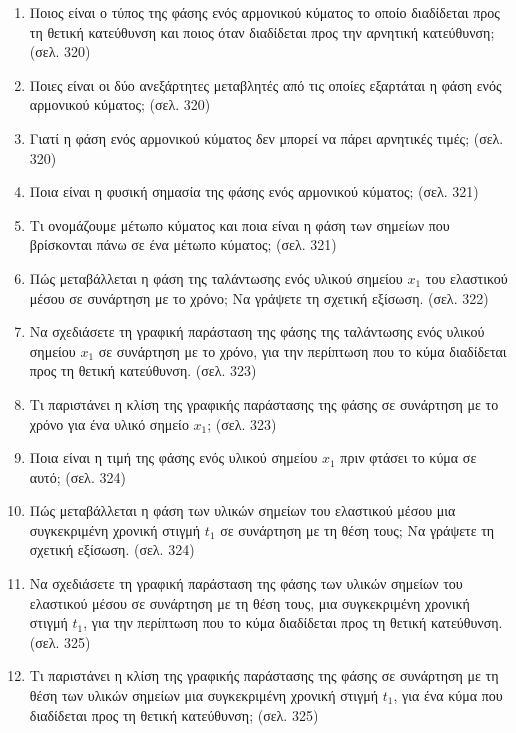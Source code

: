 \documentclass{article}
\begin{document}
\begin{enumerate}
      \item Ποιος είναι ο τύπος της φάσης ενός αρμονικού κύματος το οποίο διαδίδεται προς τη θετική κατεύθυνση και ποιος όταν διαδίδεται προς την αρνητική κατεύθυνση; (σελ. 320)

      \item Ποιες είναι οι δύο ανεξάρτητες μεταβλητές από τις οποίες εξαρτάται η φάση ενός αρμονικού κύματος; (σελ. 320)

      \item Γιατί η φάση ενός αρμονικού κύματος δεν μπορεί να πάρει αρνητικές τιμές; (σελ. 320)

      \item Ποια είναι η φυσική σημασία της φάσης ενός αρμονικού κύματος; (σελ. 321)

      \item Τι ονομάζουμε μέτωπο κύματος και ποια είναι η φάση των σημείων που βρίσκονται πάνω σε ένα μέτωπο κύματος; (σελ. 321)

      \item Πώς μεταβάλλεται η φάση της ταλάντωσης ενός υλικού σημείου $x_1$ του ελαστικού μέσου σε συνάρτηση με το χρόνο; Να γράψετε τη σχετική εξίσωση. (σελ. 322)

      \item Να σχεδιάσετε τη γραφική παράσταση της φάσης της ταλάντωσης ενός υλικού σημείου $x_1$ σε συνάρτηση με το χρόνο, για την περίπτωση που το κύμα διαδίδεται προς τη θετική κατεύθυνση. (σελ. 323)

      \item Τι παριστάνει η κλίση της γραφικής παράστασης της φάσης σε συνάρτηση με το χρόνο για ένα υλικό σημείο $x_1$; (σελ. 323)

      \item Ποια είναι η τιμή της φάσης ενός υλικού σημείου $x_1$ πριν φτάσει το κύμα σε αυτό; (σελ. 324)

      \item Πώς μεταβάλλεται η φάση των υλικών σημείων του ελαστικού μέσου μια συγκεκριμένη χρονική στιγμή $t_1$ σε συνάρτηση με τη θέση τους; Να γράψετε τη σχετική εξίσωση. (σελ. 324)

      \item Να σχεδιάσετε τη γραφική παράσταση της φάσης των υλικών σημείων του ελαστικού μέσου σε συνάρτηση με τη θέση τους, μια συγκεκριμένη χρονική στιγμή $t_1$, για την περίπτωση που το κύμα διαδίδεται προς τη θετική κατεύθυνση. (σελ. 325)

      \item Τι παριστάνει η κλίση της γραφικής παράστασης της φάσης σε συνάρτηση με τη θέση των υλικών σημείων μια συγκεκριμένη χρονική στιγμή $t_1$, για ένα κύμα που διαδίδεται προς τη θετική κατεύθυνση; (σελ. 325)


\end{enumerate}
\end{document}
